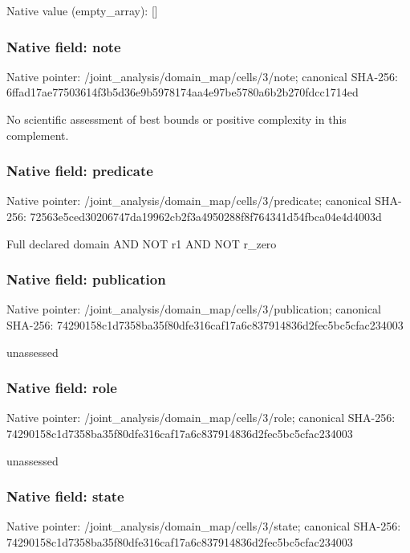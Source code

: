 \documentclass[10pt,a4paper]{article}
\begin{document}
Native value (empty\_\allowbreak{}array): []

\subsubsection{Native field: note}
Native pointer: /joint\_\allowbreak{}analysis/domain\_\allowbreak{}map/cells/3/note; canonical SHA-256: 6ffad17ae77503614f3b5d36e9b5978174aa4e97be5780a6b2b270fdcc1714ed

\begingroup\raggedright\sloppy No scientific assessment of best bounds or positive complexity in this complement.\par\endgroup

\subsubsection{Native field: predicate}
Native pointer: /joint\_\allowbreak{}analysis/domain\_\allowbreak{}map/cells/3/predicate; canonical SHA-256: 72563e5ced30206747da19962cb2f3a4950288f8f764341d54fbca04e4d4003d

\begingroup\raggedright\sloppy Full declared domain AND NOT r1 AND NOT r\_\allowbreak{}zero\par\endgroup

\subsubsection{Native field: publication}
Native pointer: /joint\_\allowbreak{}analysis/domain\_\allowbreak{}map/cells/3/publication; canonical SHA-256: 74290158c1d7358ba35f80dfe316caf17a6c837914836d2fec5bc5cfac234003

\begingroup\raggedright\sloppy unassessed\par\endgroup

\subsubsection{Native field: role}
Native pointer: /joint\_\allowbreak{}analysis/domain\_\allowbreak{}map/cells/3/role; canonical SHA-256: 74290158c1d7358ba35f80dfe316caf17a6c837914836d2fec5bc5cfac234003

\begingroup\raggedright\sloppy unassessed\par\endgroup

\subsubsection{Native field: state}
Native pointer: /joint\_\allowbreak{}analysis/domain\_\allowbreak{}map/cells/3/state; canonical SHA-256: 74290158c1d7358ba35f80dfe316caf17a6c837914836d2fec5bc5cfac234003
\end{document}
